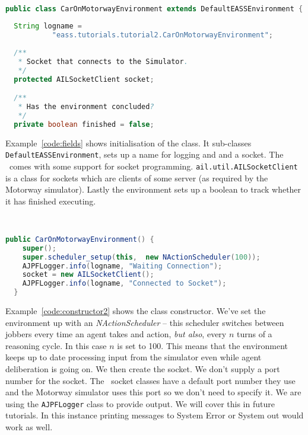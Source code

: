 \begin{ourexample}
\label{code:fields} \quad \\
\begin{lstlisting}[basicstyle=\sffamily,language=Java,style=easslisting]
public class CarOnMotorwayEnvironment extends DefaultEASSEnvironment {
  
  String logname = 
           "eass.tutorials.tutorial2.CarOnMotorwayEnvironment";
		
  /**
   * Socket that connects to the Simulator.
   */
  protected AILSocketClient socket;

  /**
   * Has the environment concluded?
   */
  private boolean finished = false;
\end{lstlisting}
\end{ourexample}
\begin{sloppypar}
Example~\ref{code:fields} shows initialisation of the class.  It sub-classes \texttt{DefaultEASSEnvironment}, sets up a name for logging and and a socket.  The \ail\ comes with some support for socket programming.  \texttt{ail.util.AILSocketClient} is a class for sockets which are clients of some server (as required by the Motorway simulator).  Lastly the environment sets up a boolean to track whether it has finished executing.
\end{sloppypar}

\begin{ourexample}
\label{code:constructor2} \quad \\
\begin{lstlisting}[basicstyle=\sffamily,language=Java,style=easslisting]
  public CarOnMotorwayEnvironment() {
    super();
    super.scheduler_setup(this,  new NActionScheduler(100));
    AJPFLogger.info(logname, "Waiting Connection");
    socket = new AILSocketClient();
    AJPFLogger.info(logname, "Connected to Socket");
  }
\end{lstlisting}
\end{ourexample}
Example~\ref{code:constructor2} shows the class constructor.  We've set the environment up with an \emph{NActionScheduler} -- this scheduler switches between jobbers every time an agent takes and action, \emph{but also}, every $n$ turns of a reasoning cycle.  In this case $n$ is set to 100.  This means that the environment keeps up to date processing input from the simulator even while agent deliberation is going on.  We then create the socket.  We don't supply a port number for the socket.  The \ail\ socket classes have a default port number they use and the Motorway simulator uses this port so we don't need to specify it.  We are using the \texttt{AJPFLogger} class to provide output.  We will cover this in future tutorials.  In this instance printing messages to System Error or System out would work as well.


